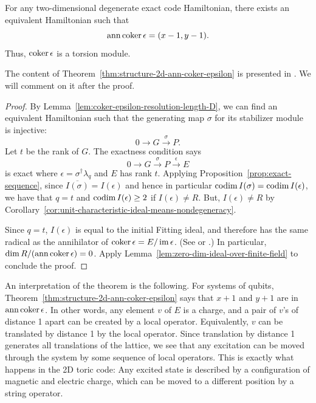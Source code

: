 \begin{theorem}
For any two-dimensional degenerate exact code Hamiltonian,
there exists an equivalent Hamiltonian such that
\[
\mathop{\mathrm{ann}}\nolimits \mathop{\mathrm{coker}}\nolimits \epsilon = (x-1,y-1).
\]
Thus, $\mathop{\mathrm{coker}}\nolimits \epsilon$ is a torsion module.
\label{thm:structure-2d-ann-coker-epsilon}
\end{theorem}
The content of Theorem~\ref{thm:structure-2d-ann-coker-epsilon}
is presented in \cite{Bombin2011Structure}.
We will comment on it after the proof.
\begin{proof}
By Lemma~\ref{lem:coker-epsilon-resolution-length-D},
we can find an equivalent Hamiltonian such that the generating map $\sigma$ for its stabilizer module
is injective:
\[
 0 \to G \xrightarrow{\sigma} P .
\]
Let $t$ be the rank of $G$.
The exactness condition says
\[
 0 \to G \xrightarrow{\sigma} P \xrightarrow{\epsilon} E
\]
is exact where $\epsilon = \sigma^\dagger \lambda_q$ and $E$ has rank $t$.
Applying Proposition~\ref{prop:exact-sequence},
since $\overline{ I(\sigma) } = I(\epsilon)$ 
and hence in particular $\mathop{\mathrm{codim}}\nolimits I(\sigma) = \mathop{\mathrm{codim}}\nolimits I(\epsilon)$,
we have that $q=t$ and $\mathop{\mathrm{codim}}\nolimits I(\epsilon) \ge 2$ if $I(\epsilon) \ne R$.
But, $I(\epsilon) \ne R$ by Corollary~\ref{cor:unit-characteristic-ideal-means-nondegeneracy}.

Since $q=t$, $I(\epsilon)$ is equal to the initial Fitting ideal,
and therefore has the same radical as the annihilator of $\mathop{\mathrm{coker}}\nolimits \epsilon = E/ \mathop{\mathrm{im}}\nolimits \epsilon$.
(See \cite[Proposition~20.7]{Eisenbud} or \cite[Chapter~XIX Proposition~2.5]{Lang}.)
In particular, $\dim R / (\mathop{\mathrm{ann}}\nolimits \mathop{\mathrm{coker}}\nolimits \epsilon) = 0$.
Apply Lemma~\ref{lem:zero-dim-ideal-over-finite-field} to conclude the proof.
\end{proof}

An interpretation of the theorem is the following.
For systems of qubits, Theorem~\ref{thm:structure-2d-ann-coker-epsilon} says that
$x+1$ and $y+1$ are in $\mathop{\mathrm{ann}}\nolimits \mathop{\mathrm{coker}}\nolimits \epsilon$.
In other words, any element $v$ of $E$ is a charge,
and a pair of $v$'s of distance 1 apart
can be created by a local operator.
Equivalently, $v$ can be translated by distance 1 by the local operator.
Since translation by distance 1 generates all translations of the lattice,
we see that any excitation can be moved through the system by some sequence of local operators.
This is exactly what happens in the 2D toric code:
Any excited state is described by a configuration of magnetic and electric charge,
which can be moved to a different position by a string operator.

